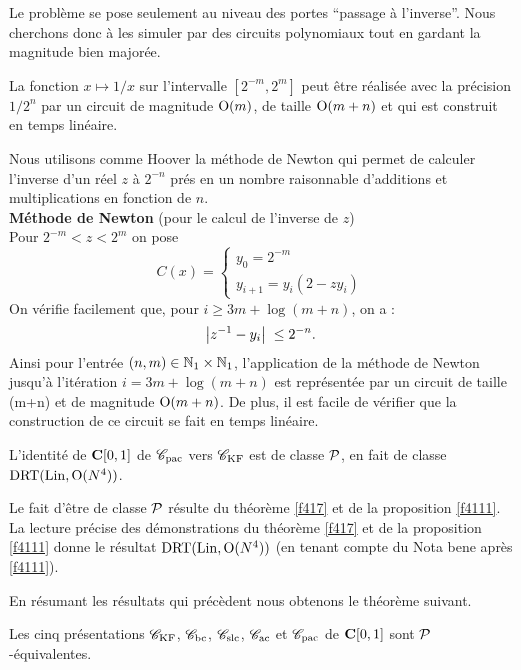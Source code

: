 Le problème se pose seulement au niveau des portes ``passage à l'inverse''. 
Nous cherchons donc à les simuler  par des circuits polynomiaux tout en 
gardant la magnitude bien majorée.

\begin{flemma} \label{f429}
La fonction   $ x \mapsto 1/x  $  sur l'intervalle  $[2^{-m}, 2^m]$  peut être 
réalisée avec la précision   $ 1/2^n  $   par un circuit \poll de 
magnitude ${\rm O}(m)$,  de taille  $ {\rm O}(m+n) $   et qui est construit en temps 
linéaire.
\end{flemma}

\proof Nous utilisons comme Hoover la méthode de Newton qui permet de calculer l'inverse d'un réel $z$ à $2^{-n}$ prés en un nombre raisonnable 
d'additions et multiplications en fonction de $n$.\\
{\bf Méthode de Newton} (pour le calcul de l'inverse de $z$)\\
Pour   $2^{-m} < z < 2^m$  on pose 
\[
C(x) = \left\{
\begin{array}{l} 
y_0 = 2^{-m} \\ 
y_{i+1} = y_i (2- zy_i) 
\end{array}
\right.
\]
On vérifie facilement que, pour    $i \geq 3m + \log(m+n)$,  on a :
\[
\left|{ z^{-1} - y_i }\right|\;  \leq 2^{-n}.
\]
Ainsi pour l'entrée  $(n,m) \in \mathbb {N}_1 \times \mathbb {N}_1$,  
l'application de la méthode de Newton jusqu'à l'itération  
$i = 3m + \log(m+n)$  est représentée par un circuit \poll de taille 
\Oo(m+n) et de magnitude  ${\rm O}(m+n)$.  De plus, il est facile de vérifier que la 
construction de ce circuit se fait en temps linéaire.
  \eop

\begin{fproposition} \label{f4210}
L'identité de  ${{\bf C}[0,1]}$  de  ${{{\mathscr C}}_{\rm pac}}$  vers  ${{{\mathscr C}}_{\rm KF}}$  est \uni de classe  ${\cal P}$, en 
fait de classe  ${\rm DRT}({\rm Lin}, {\rm O}(N^4))$.
\end{fproposition} 

\proof 
Le fait d'être de classe  ${\cal P}$   résulte du théorème \ref{f417} et de la 
proposition \ref{f4111}.  La lecture précise des démonstrations du théorème 
\ref{f417} et de la proposition \ref{f4111} donne le résultat    
${\rm DRT}({\rm Lin},{\rm O}(N^4))$   (en tenant compte du Nota bene après \ref{f4111}).  
\eop

\smallskip En résumant les résultats qui précèdent nous obtenons le théorème 
suivant.
\begin{ftheorem} \label{f4211}
Les cinq présentations    ${{{\mathscr C}}_{\rm KF}}$,  ${{{\mathscr C}}_{\rm bc}}$,  ${{{\mathscr C}}_{\rm slc}}$,  ${{{\mathscr C}}_{\rm ac}}$   et   ${{{\mathscr C}}_{\rm pac}}$  de  
${{\bf C}[0,1]}$  sont   ${\cal P}$-équivalentes.
\end{ftheorem}

